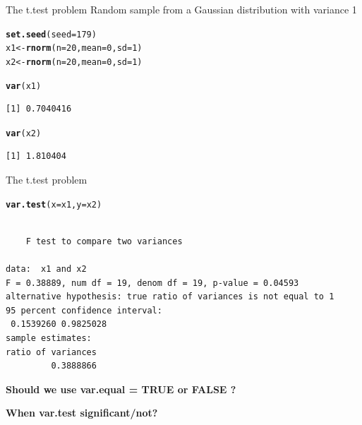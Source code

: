 \documentclass[10pt]{beamer}\usepackage[]{graphicx}\usepackage[]{color}
\makeatletter
\newcommand{\hlnum}[1]{\textcolor[rgb]{0.686,0.059,0.569}{#1}}%
\newcommand{\hlstd}[1]{\textcolor[rgb]{0.345,0.345,0.345}{#1}}%
\newcommand{\hlkwb}[1]{\textcolor[rgb]{0.69,0.353,0.396}{#1}}%
\newcommand{\hlkwc}[1]{\textcolor[rgb]{0.333,0.667,0.333}{#1}}%
\newcommand{\hlkwd}[1]{\textcolor[rgb]{0.737,0.353,0.396}{\textbf{#1}}}%
\newenvironment{kframe}{%
 \def\at@end@of@kframe{}%
 \ifinner\ifhmode%
  \def\at@end@of@kframe{\end{minipage}}%
  \begin{minipage}{\columnwidth}%
 \fi\fi%
 \def\FrameCommand##1{\hskip\@totalleftmargin \hskip-\fboxsep
 \colorbox{shadecolor}{##1}\hskip-\fboxsep
     \hskip-\linewidth \hskip-\@totalleftmargin \hskip\columnwidth}%
 \MakeFramed {\advance\hsize-\width
   \@totalleftmargin\z@ \linewidth\hsize
   \@setminipage}}%
 {\par\unskip\endMakeFramed%
 \at@end@of@kframe}
\newenvironment{knitrout}{}{} %
\makeatother
\begin{document}
\begin{frame}[fragile]{The t.test problem}
  Random sample from a Gaussian distribution with variance 1
\begin{knitrout}
\color{fgcolor}\begin{kframe}
\begin{alltt}
  \hlkwd{set.seed}\hlstd{(}\hlkwc{seed} \hlstd{=} \hlnum{179}\hlstd{)}
  \hlstd{x1} \hlkwb{<-} \hlkwd{rnorm}\hlstd{(}\hlkwc{n} \hlstd{=} \hlnum{20}\hlstd{,} \hlkwc{mean} \hlstd{=} \hlnum{0}\hlstd{,} \hlkwc{sd} \hlstd{=} \hlnum{1}\hlstd{)}
  \hlstd{x2} \hlkwb{<-} \hlkwd{rnorm}\hlstd{(}\hlkwc{n} \hlstd{=} \hlnum{20}\hlstd{,} \hlkwc{mean} \hlstd{=} \hlnum{0}\hlstd{,} \hlkwc{sd} \hlstd{=} \hlnum{1}\hlstd{)}


  \hlkwd{var}\hlstd{(x1)}
\end{alltt}
\begin{verbatim}
[1] 0.7040416
\end{verbatim}
\begin{alltt}
  \hlkwd{var}\hlstd{(x2)}
\end{alltt}
\begin{verbatim}
[1] 1.810404
\end{verbatim}
\end{kframe}
\end{knitrout}
\end{frame}

\begin{frame}[fragile]{The t.test problem}
\begin{knitrout}
\color{fgcolor}\begin{kframe}
\begin{alltt}
  \hlkwd{var.test}\hlstd{(}\hlkwc{x} \hlstd{= x1,} \hlkwc{y} \hlstd{= x2)}
\end{alltt}
\begin{verbatim}

	F test to compare two variances

data:  x1 and x2
F = 0.38889, num df = 19, denom df = 19, p-value = 0.04593
alternative hypothesis: true ratio of variances is not equal to 1
95 percent confidence interval:
 0.1539260 0.9825028
sample estimates:
ratio of variances 
         0.3888866 
\end{verbatim}
\end{kframe}
\end{knitrout}
  \textbf{Should we use var.equal = TRUE or FALSE ?\\}
  
  \textbf{When var.test significant/not?}
\end{frame}
\end{document}
